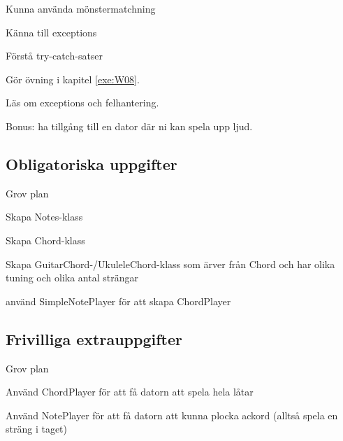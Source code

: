 

\Lab{\LabWeekEIGHT}

\begin{Goals}
\item Kunna använda mönstermatchning
\item Känna till exceptions
\item Förstå try-catch-satser

\end{Goals}

\begin{Preparations}
\item Gör övning {\tt \ExeWeekEIGHT} i kapitel \ref{exe:W08}.
\item Läs om exceptions och felhantering.
\item Bonus: ha tillgång till en dator där ni kan spela upp ljud.
\end{Preparations}

\subsection{Obligatoriska uppgifter}

\Task Grov plan

\Subtask Skapa Notes-klass

\Subtask Skapa Chord-klass

\Subtask Skapa GuitarChord-/UkuleleChord-klass som ärver från Chord och har
olika tuning och olika antal strängar

\Subtask använd SimpleNotePlayer för att skapa ChordPlayer

\subsection{Frivilliga extrauppgifter}

\Task Grov plan

\Subtask Använd ChordPlayer för att få datorn att spela hela låtar

\Subtask Använd NotePlayer för att få datorn att kunna plocka ackord (alltså
spela en sträng i taget)
